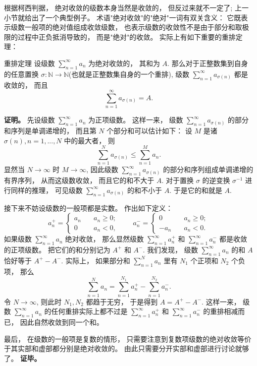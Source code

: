 根据柯西判据， 绝对收敛的级数本身当然是收敛的， 但反过来就不一定了; 上一小节就给出了一个典型例子。 术语"绝对收敛"的"绝对"一词有双关含义： 它既表示级数一般项的绝对值组成收敛级数， 也表示级数的收敛性不是由于部分和取极限的过程中正负抵消导致的， 而是"绝对"的收敛。 实际上有如下重要的重排定理：

\begin{theorem}{重排定理}
设级数 $\sum_{n=1}^\infty a_n$ 为绝对收敛的， 其和为 $A$. 那么对于正整数集到自身的任意置换 $\sigma:\mathbb{N}\to\mathbb{N}$(也就是正整数集自身的一个重排), 级数 $\sum_{n=1}^\infty a_{\sigma(n)}$ 都是收敛的， 而且
$$
\sum_{n=1}^\infty a_{\sigma(n)}=A.
$$
\end{theorem}

\textbf{证明。} 先设级数 $\sum_{n=1}^\infty a_n$ 为正项级数。 这样一来， 级数 $\sum_{n=1}^\infty a_{\sigma(n)}$ 的部分和序列是单调递增的， 而且第 $N$ 个部分和可以估计如下： 设 $M$ 是诸 $\sigma(n),n=1,...,N$ 中的最大者， 则
$$
\sum_{n=1}^Na_{\sigma(n)}\leq\sum_{n=1}^{M}a_n.
$$
显然当 $N\to\infty$ 时 $M\to\infty$, 因此级数 $\sum_{n=1}^\infty a_{\sigma(n)}$ 的部分和序列组成单调递增的有界序列， 从而这级数收敛， 而且它的和不大于 $A$. 对于置换 $\sigma$ 的逆变换 $\sigma^{-1}$ 进行同样的推理， 可见级数 $\sum_{n=1}^\infty a_{\sigma(n)}$ 的和不小于 $A$. 于是它的和就是 $A$.

接下来不妨设级数的一般项都是实数。 作出如下定义：
$$
a_n^+=\left\{\begin{array}{cc}
{a_n}\quad &a_n\geq0;\\
0\quad &a_n<0,
\end{array}\right.
\quad\quad
a_n^-=\left\{\begin{array}{cc}
0\quad &a_n\geq0;\\
-a_n\quad &a_n<0.
\end{array}\right.
$$
如果级数 $\sum_{n=1}^\infty a_n$ 绝对收敛， 那么显然级数 $\sum_{n=1}^\infty a_n^+$ 和 $\sum_{n=1}^\infty a_n^-$ 都是收敛的正项级数。 把它们的和分别记为 $A^+$ 和 $A^-$. 我们发现， 级数 $\sum_{n=1}^\infty a_n$ 的和 $A$ 恰好等于 $A^+-A^-$. 实际上， 如果部分和 $\sum_{n=1}^N a_n$ 里有 $N_1$ 个正项和 $N_2$ 个负项， 那么
$$
\sum_{n=1}^N a_n=\sum_{n=1}^{N_1} a_n^+-\sum_{n=1}^{N_2} a_n^-.
$$
令 $N\to\infty$, 则此时 $N_1,N_2$ 都趋于无穷， 于是得到 $A=A^+-A^-$. 这样一来， 级数 $\sum_{n=1}^\infty a_n$ 的任何重排实际上都不过是 $\sum_{n=1}^\infty a_n^+$ 和 $\sum_{n=1}^\infty a_n^-$ 的重排相减而已， 因此自然收敛到同一个和。

最后， 在级数的一般项是复数的情形， 只需要注意到复数项级数的绝对收敛等价于其实部和虚部都分别是绝对收敛的。 由此只需要分开实部和虚部进行讨论就够了。 \textbf{证毕。}